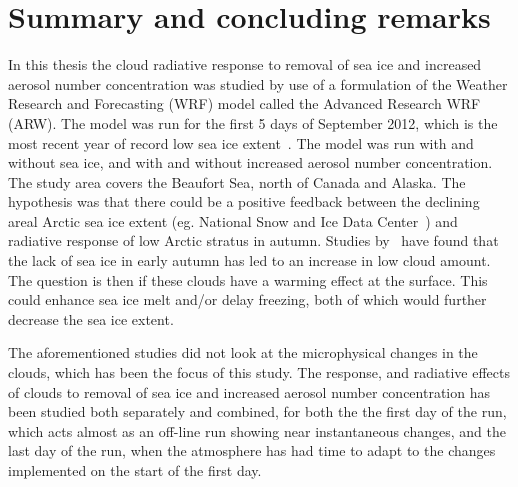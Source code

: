 \chapter{Summary and concluding remarks}
\label{chap:summaryconclusions}
In this thesis the cloud radiative response to removal of sea ice and increased aerosol number concentration was studied by use of a formulation of the Weather Research and Forecasting (WRF) model called the Advanced Research WRF (ARW). The model was run for the first 5 days of September 2012, which is the most recent year of record low sea ice extent~\citep{NSIDC}. The model was run with and without sea ice, and with and without increased aerosol number concentration. The study area covers the Beaufort Sea, north of Canada and Alaska. The hypothesis was that there could be a positive feedback between the declining areal Arctic sea ice extent (eg. National Snow and Ice Data Center~\citep{NSIDC}) and radiative response of low Arctic stratus in autumn. Studies by~\citet{Eastman2010a,Kay2009,Palm2010} have found that the lack of sea ice in early autumn has led to an increase in low cloud amount. The question is then if these clouds have a warming effect at the surface. This could enhance sea ice melt and/or delay freezing, both of which would further decrease the sea ice extent. 

The aforementioned studies did not look at the microphysical changes in the clouds, which has been the focus of this study. The response, and radiative effects of clouds to removal of sea ice and increased aerosol number concentration has been studied both separately and combined, for both the the first day of the run, which acts almost as an off-line run showing near instantaneous changes, and the last day of the run, when the atmosphere has had time to adapt to the changes implemented on the start of the first day.

